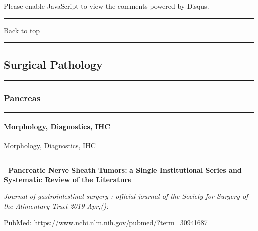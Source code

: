 \documentclass[]{article}
\let\oldparagraph\paragraph
\renewcommand{\paragraph}[1]{\oldparagraph{#1}\mbox{}}
\begin{document}
Please enable JavaScript to view the comments powered by Disqus.

\begin{center}\rule{0.5\linewidth}{\linethickness}\end{center}

Back to top

\begin{center}\rule{0.5\linewidth}{\linethickness}\end{center}

\pagebreak

\hypertarget{surgical-pathology}{%
\subsection{Surgical Pathology}\label{surgical-pathology}}

\begin{center}\rule{0.5\linewidth}{\linethickness}\end{center}

\hypertarget{pancreas}{%
\subsubsection{Pancreas}\label{pancreas}}

\begin{center}\rule{0.5\linewidth}{\linethickness}\end{center}

\hypertarget{morphology-diagnostics-ihc}{%
\paragraph{Morphology, Diagnostics,
IHC}\label{morphology-diagnostics-ihc}}

Morphology, Diagnostics, IHC

\begin{center}\rule{0.5\linewidth}{\linethickness}\end{center}

 - \textbf{Pancreatic Nerve Sheath Tumors: a Single Institutional Series
and Systematic Review of the Literature}

\emph{Journal of gastrointestinal surgery : official journal of the
Society for Surgery of the Alimentary Tract 2019 Apr;():}

PubMed: \url{https://www.ncbi.nlm.nih.gov/pubmed/?term=30941687}
\end{document}
